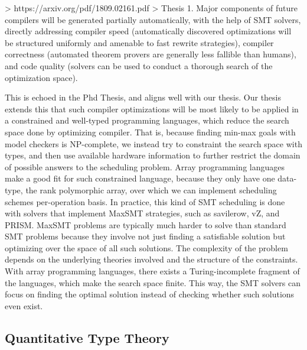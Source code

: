 \documentclass[10pt,a4paper]{article}
\begin{document}
> https://arxiv.org/pdf/1809.02161.pdf
> Thesis 1. Major components of future compilers will be generated partially automatically, with the help of SMT solvers, directly addressing compiler speed (automatically discovered optimizations will be structured uniformly and amenable to fast rewrite strategies), compiler correctness (automated theorem provers are generally less fallible than humans), and code quality (solvers can be used to conduct a thorough search of the optimization space).

This is echoed in the Phd Thesis, and aligns well with our thesis.
Our thesis extends this that such compiler optimizations will be most likely to be applied in a constrained and well-typed programming languages, which reduce the search space done by optimizing compiler.
That is, because finding min-max goals with model checkers is NP-complete, we instead try to constraint the search space with types, and then use available hardware information to further restrict the domain of possible answers to the scheduling problem.
Array programming languages make a good fit for such constrained language, because they only have one data-type, the rank polymorphic array, over which we can implement scheduling schemes per-operation basis.
In practice, this kind of SMT scheduling is done with solvers that implement MaxSMT strategies, such as savilerow, vZ, and PRISM.
MaxSMT problems are typically much harder to solve than standard SMT problems because they involve not just finding a satisfiable solution but optimizing over the space of all such solutions. The complexity of the problem depends on the underlying theories involved and the structure of the constraints.
With array programming languages, there exists a Turing-incomplete fragment of the languages, which make the search space finite.
This way, the SMT solvers can focus on finding the optimal solution instead of checking whether such solutions even exist.

\subsection{Quantitative Type Theory}
\end{document}
